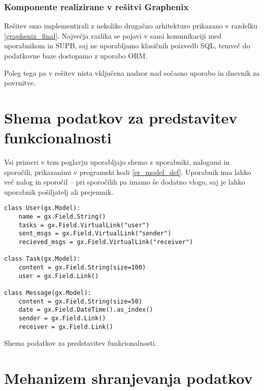 \documentclass[a4paper,12pt,openright]{book}
\begin{document}
    \subsubsection{Komponente realizirane v rešitvi Graphenix}

    Rešitev smo implementirali z nekoliko drugačno arhitekturo prikazano v razdelku \ref{graphenix_final}.
    Največja razlika se pojavi v sami komunikaciji med uporabnikom in SUPB, saj ne uporabljamo klasičnih poizvedb SQL, temveč do podatkovne baze dostopamo z uporabo ORM.

    Poleg tega pa v rešitev nista vključena nadzor nad sočasno uporabo in dnevnik za povrnitve.
    
    \section{Shema podatkov za predstavitev funkcionalnosti}
    
    Vsi primeri v tem poglavju uporabljajo shemo z uporabniki, nalogami in sporočili, prikazanimi v programski kodi \ref{er_model_def}. Uporabnik ima lahko več nalog in sporočil – pri sporočilih pa imamo še dodatno vlogo, saj je lahko uporabnik pošiljatelj ali prejemnik.

\begin{code}
\begin{verbatim}
class User(gx.Model):
    name = gx.Field.String()
    tasks = gx.Field.VirtualLink("user")
    sent_msgs = gx.Field.VirtualLink("sender")
    recieved_msgs = gx.Field.VirtualLink("receiver")

class Task(gx.Model):
    content = gx.Field.String(size=100)
    user = gx.Field.Link()

class Message(gx.Model):
    content = gx.Field.String(size=50)
    date = gx.Field.DateTime().as_index()
    sender = gx.Field.Link()
    receiver = gx.Field.Link()
\end{verbatim}
\caption{Shema podatkov za predstavitev funkcionalnosti.}
\label{er_model_def}
\end{code}
    
    \section{Mehanizem shranjevanja podatkov}
\end{document}
